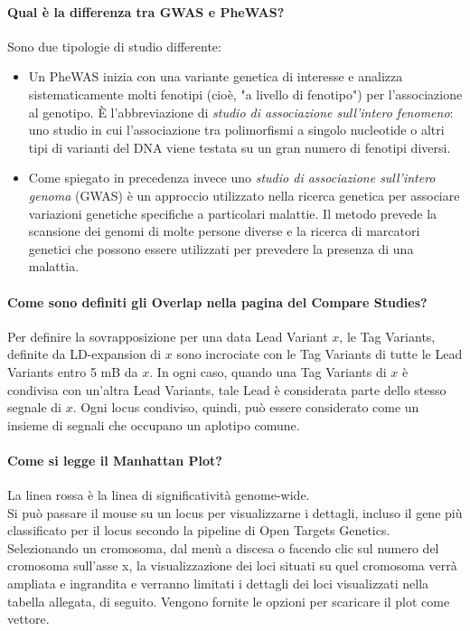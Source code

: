 \documentclass{article}
\begin{document}
\paragraph{Qual è la differenza tra GWAS e PheWAS?}
Sono due tipologie di studio differente:
\begin{itemize}
    \item Un PheWAS inizia con una variante genetica di interesse e analizza sistematicamente molti fenotipi (cioè, "a livello di fenotipo") per l'associazione al genotipo. È l'abbreviazione di \textit{studio di associazione sull'intero fenomeno}: uno studio in cui l'associazione tra polimorfismi a singolo nucleotide o altri tipi di varianti del DNA viene testata su un gran numero di fenotipi diversi.
    \item Come spiegato in precedenza invece uno \textit{studio di associazione sull'intero genoma} (GWAS) è un approccio utilizzato nella ricerca genetica per associare variazioni genetiche specifiche a particolari malattie. Il metodo prevede la scansione dei genomi di molte persone diverse e la ricerca di marcatori genetici che possono essere utilizzati per prevedere la presenza di una malattia.
\end{itemize}
\paragraph{Come sono definiti gli Overlap nella pagina del Compare Studies?}
Per definire la sovrapposizione per una data Lead Variant $x$, le Tag Variants, definite da LD-expansion di $x$ sono incrociate con le Tag Variants di tutte le Lead Variants entro 5 mB da $x$. In ogni caso, quando una Tag Variants di $x$ è condivisa con un'altra Lead Variants, tale Lead è considerata parte dello stesso segnale di $x$. Ogni locus condiviso, quindi, può essere considerato come un insieme di segnali che occupano un aplotipo comune.
\paragraph{Come si legge il Manhattan Plot?}
La linea rossa è la linea di significatività genome-wide.\\
Si può passare il mouse su un locus per visualizzarne i dettagli, incluso il gene più classificato per il locus secondo la pipeline di Open Targets Genetics. Selezionando un cromosoma, dal menù a discesa o facendo clic sul numero del cromosoma sull'asse x, la visualizzazione dei loci situati su quel cromosoma verrà ampliata e ingrandita e verranno limitati i dettagli dei loci visualizzati nella tabella allegata, di seguito. Vengono fornite le opzioni per scaricare il plot come vettore.
\end{document}
